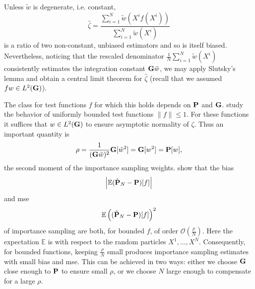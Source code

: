 Unless $\tilde w$ is degenerate, i.e. constant, $$\hat\zeta = \frac{\sum_{i = 1}^N \tilde w (X^{i} f(X^{i}))}{\sum_{i = 1}^{N} \tilde w(X^{i})}$$ is a ratio of two non-constant, unbiased estimators and so is itself biased. Nevertheless, noticing that the rescaled denominator $\frac{1}{N} \sum_{i = 1}^{N} \tilde w(X^{i})$ consistently estimates the integration constant $\G \tilde w$, we may apply Slutsky's lemma and obtain a central limit theorem for $\hat \zeta$ (recall that we assumed $fw \in L^{2}(\G)$).

The class for test functions $f$ for which this holds depends on $\P$ and $\G$. \citet{Agapiou2017Importance} study the behavior of uniformly bounded test functions $\lVert f \rVert \leq 1$. For these functions it suffices that $w \in L^{2}(\G)$ to ensure asymptotic normality of $\zeta$.
Thus an important quantity is
$$
\rho = \frac{1}{(\G \tilde w)^{2}}\G[\tilde w^{2}] = \G [w^{2}] =  \P [w],
$$
the second moment of the importance sampling weights. \citet{Agapiou2017Importance} show that the bias 
\begin{align}
    \label{eq:agapiou_bias}
\left| \mathbb E (\hat\P_{N} - \P)[f] \right|
\end{align}
and \acrfull{mse}
\begin{align}
    \label{eq:agapiou_mse}
\mathbb E \left( (\hat \P_{N} - \P) [f] \right)^{2}
\end{align}
of importance sampling are both, for bounded $f$, of order $\mathcal O \left(\frac{\rho}{N}\right)$. Here the expectation $\mathbb E$ is with respect to the random particles $X^{1}, \dots, X^{N}$. Consequently, for bounded functions, keeping $ \frac{\rho}{N}$ small produces importance sampling estimates with small bias and \gls{mse}. This can be achieved in two ways: either we choose $\G$ \glqq{}close enough\grqq{} to $\P$ to ensure small $\rho$, or we choose $N$ large enough to compensate for a large $\rho$.

